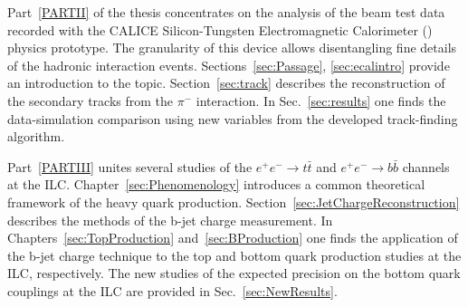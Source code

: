Part~\ref{PARTII} of the thesis concentrates on the analysis of the beam test data recorded with the CALICE Silicon-Tungsten Electromagnetic Calorimeter (\ecal) physics prototype. The granularity of this device allows disentangling fine details of the hadronic interaction events. Sections~\ref{sec:Passage}, \ref{sec:ecalintro} provide an introduction to the topic. Section~\ref{sec:track} describes the reconstruction of the secondary tracks from the $\pi^-$ interaction. 
In Sec.~\ref{sec:results} one finds the data-simulation comparison using new variables from the developed track-finding algorithm.

Part~\ref{PARTIII} unites several studies  of the $e^+e^- \to t\bar{t}$ and $e^+e^- \to b\bar{b}$ channels at the ILC.%
Chapter~\ref{sec:Phenomenology} introduces a common theoretical framework of the heavy quark production. Section~\ref{sec:JetChargeReconstruction} describes the methods of the b-jet charge measurement. In Chapters~\ref{sec:TopProduction} and~\ref{sec:BProduction} one finds the application of the b-jet charge technique to the top and bottom quark production studies at the ILC, respectively. The new studies of the expected precision on the bottom quark couplings at the ILC are provided in Sec.~\ref{sec:NewResults}. 











